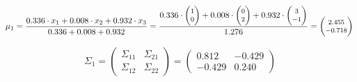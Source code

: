 \documentclass[12pt]{article}
\begin{document}
\begin{enumerate}
        \begin{equation*}
            \fontsize{8pt}{10pt}\selectfont
            \mu_1 = \frac{0.336 \cdot x_1 + 0.008 \cdot x_2 + 0.932 \cdot x_3}{0.336+0.008+0.932} = \frac{0.336 \cdot \begin{pmatrix}
            1\\
            0
            \end{pmatrix}+ 0.008 \cdot \begin{pmatrix}
            0\\
            2
            \end{pmatrix} + 0.932 \cdot \begin{pmatrix}
            3\\
            -1
            \end{pmatrix}}{1.276} = \begin{pmatrix}
            2.455\\
            -0.718
            \end{pmatrix}\\
        \end{equation*}

        \begin{equation*}
            \Sigma_1 = \begin{pmatrix}
                \Sigma_{11} & \Sigma_{21} \\
                \Sigma_{12} & \Sigma_{22}
            \end{pmatrix} = \begin{pmatrix}
                0.812 & -0.429\\
                -0.429 & 0.240
            \end{pmatrix}
        \end{equation*}


\end{enumerate}
\end{document}
